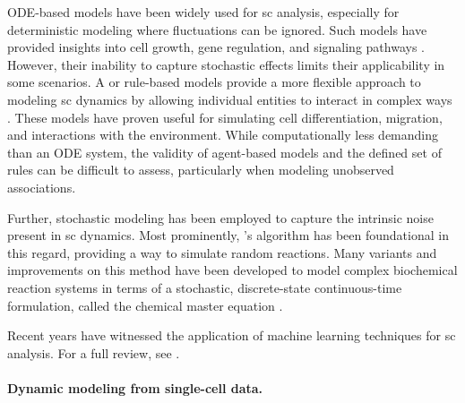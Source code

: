 \acrshort{ODE}-based models have been widely used for \acrlong{sc} analysis, especially for deterministic modeling where fluctuations can be ignored. Such models have provided insights into cell growth, gene regulation, and signaling pathways \citep{busch2015fundamental, raue2015data2dynamics, tyson2003sniffers, alon2019introduction}. However, their inability to capture stochastic effects limits their applicability in some scenarios.
A or rule-based models provide a more flexible approach to modeling \acrlong{sc} dynamics by allowing individual entities to interact in complex ways \citep{an2009agent}. These models have proven useful for simulating cell differentiation, migration, and interactions with the environment. While computationally less demanding than an ODE system, the validity of agent-based models and the defined set of rules can be difficult to assess, particularly when modeling unobserved associations.

Further, stochastic modeling has been employed to capture the intrinsic noise present in \acrlong{sc} dynamics. Most prominently, \citeauthor{gillespie1977exact}'s algorithm \citep{gillespie1977exact} has been foundational in this regard, providing a way to simulate random reactions. Many variants and improvements on this method have been developed to model complex biochemical reaction systems \citep{gibson2000efficient} in terms of a stochastic, discrete-state continuous-time formulation, called the chemical master equation \citep{liang2010computational}.

Recent years have witnessed the application of machine learning techniques for \acrlong{sc} analysis. For a full review, see \citet{oh2021temporal}.

\paragraph{Dynamic modeling from single-cell data.}

